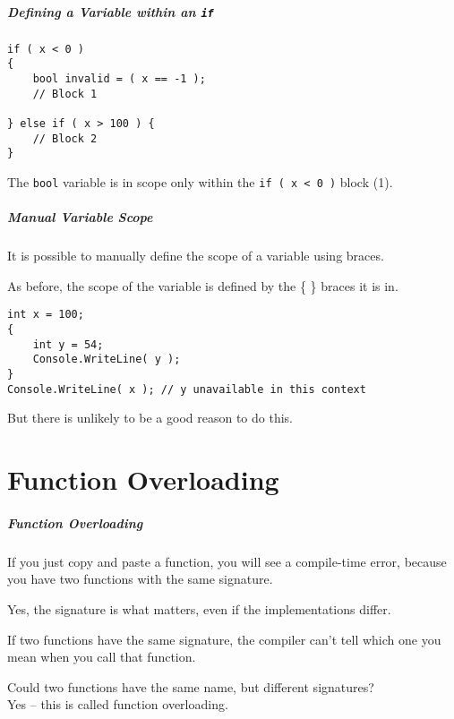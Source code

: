\begin{frame}[fragile]
\frametitle{Defining a Variable within an \texttt{if}}

\begin{verbatim}
if ( x < 0 )
{
    bool invalid = ( x == -1 );
    // Block 1
    
} else if ( x > 100 ) {
    // Block 2
}
\end{verbatim}

The \texttt{bool} variable is in scope only within the \texttt{if ( x < 0 )} block (1).

\end{frame}

\begin{frame}[fragile]
\frametitle{Manual Variable Scope}
It is possible to manually define the scope of a variable using braces.

As before, the scope of the variable is defined by the \{ \} braces it is in.

\begin{verbatim}
int x = 100;
{
    int y = 54;
    Console.WriteLine( y );
}
Console.WriteLine( x ); // y unavailable in this context
\end{verbatim}

But there is unlikely to be a good reason to do this.


\end{frame}

\part{Function Overloading}
\begin{frame}\partpage\end{frame}

\begin{frame}
\frametitle{Function Overloading}
If you just copy and paste a function, you will see a compile-time error, because you have two functions with the same signature.

Yes, the signature is what matters, even if the implementations differ.

If two functions have the same signature, the compiler can't tell which one you mean when you call that function.

Could two functions have the same name, but different signatures?\\
\quad Yes -- this is called \alert{function overloading}.

\end{frame}

